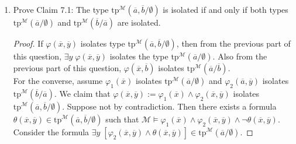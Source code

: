 \documentclass{article}
\begin{document}
\begin{enumerate}[label={\bf Q\arabic*:}]
\begin{enumerate}
\begin{proof}
          The second assertion can be proven in a similar manner. Assume by
          contradiction that $\varphi(x,b)$ does not isolate
          $\text{tp}^{\mathcal{M}}(a/b)$. Then there must exist a formula
          $\theta(x,b)\in\text{tp}^{\mathcal{M}}(a/b)$ such that
          $\mathcal{M}\not\models\varphi(x,b)\rightarrow\theta(x,b)$. This
          means there exists $a'\in M$ such that
          $\mathcal{M}\models\varphi(a',b)\wedge\neg\theta(a',b)$, which
          means $\mathcal{M}\not\models\varphi(x,y)\rightarrow\theta(x,y)$.
          However, since
          $\theta(x,y)\in\text{tp}^{\mathcal{M}}(a,b/\emptyset)$, the
          statement contradicts $\varphi(x,y)$ isolating
          $\text{tp}^{\mathcal{M}}(a,b/\emptyset)$. \\
        \end{proof}

      \item Prove Claim 7.1: The type
        $\text{tp}^{\mathcal{M}}(\overline{a},\overline{b}/\emptyset)$ is
        isolated if and only if both types
        $\text{tp}^{\mathcal{M}}(\overline{a}/\emptyset)$ and
        $\text{tp}^{\mathcal{M}}(\overline{b}/\overline{a})$ are isolated.

        \begin{proof}
          If $\varphi(\overline{x},\overline{y})$ isolates type
          $\text{tp}^{\mathcal{M}}(\overline{a},\overline{b}/\emptyset)$,
          then from the previous part of this question, $\exists y\;
          \varphi(\overline{x},\overline{y})$ isolates the type
          $\text{tp}^{\mathcal{M}}(\overline{a}/\emptyset)$. Also from the
          previous part of this question,
          $\varphi(\overline{x},\overline{b})$ isolates
          $\text{tp}^{\mathcal{M}}(\overline{a}/\overline{b})$. \\

          For the converse, assume $\varphi_1(\overline{x})$ isolates
          $\text{tp}^{\mathcal{M}}(\overline{a}/\emptyset)$ and
          $\varphi_2(\overline{a},\overline{y})$ isolates
          $\text{tp}^{\mathcal{M}}(\overline{b}/\overline{a})$. We claim
          that
          $\varphi(\overline{x},\overline{y}):=
          \varphi_1(\overline{x})\wedge\varphi_2(\overline{x},\overline{y})$
          isolates
          $\text{tp}^{\mathcal{M}}(\overline{a},\overline{b}/\emptyset)$.
          Suppose not by contradiction. Then there exists a formula
          $\theta(\overline{x},\overline{y})\in
          \text{tp}^{\mathcal{M}}(\overline{a},\overline{b}/\emptyset)$
          such that $\mathcal{M}\models
          \varphi_1(\overline{x})\wedge\varphi_2(\overline{x},\overline{y})
          \wedge \neg\theta(\overline{x},\overline{y})$. Consider the
          formula $\exists y\; [\varphi_2(\overline{x},\overline{y})\wedge
          \theta(\overline{x},\overline{y})]\in
          \text{tp}^{\mathcal{M}}(\overline{a}/\emptyset)$.
        \end{proof}
    \end{enumerate}
\end{enumerate}
\end{document}
